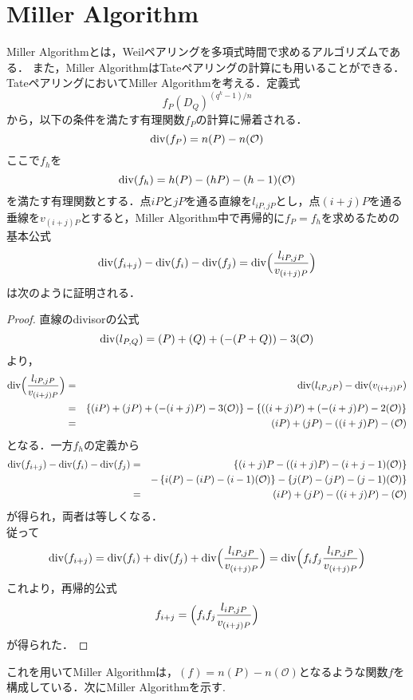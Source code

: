 \section{Miller Algorithm}
\par
Miller Algorithm\cite{MIA}とは，Weilペアリングを多項式時間で求めるアルゴリズムである．
また，Miller AlgorithmはTateペアリングの計算にも用いることができる．TateペアリングにおいてMiller Algorithmを考える．定義式
\[
f_P(D_Q)^{{(q^k-1)}/n}
\]
から，以下の条件を満たす有理関数$f_P$の計算に帰着される．
\[
{\rm div}(f_P)=n(P)-n(\mathcal{O})
\]
ここで$f_h$を
\[
{\rm div}(f_h)=h(P)-(hP)-(h-1)(\mathcal{O})
\]
を満たす有理関数とする．点$iP$と$jP$を通る直線を$l_{iP,jP}$とし，点$(i+j)P$を通る垂線を$v_{(i+j)P}$とすると，Miller Algorithm中で再帰的に$f_P=f_h$を求めるための基本公式
\[
{\rm div}(f_{i+j})-{\rm div}(f_i)-{\rm div}(f_j)={\rm div}\Bigl(\frac{l_{iP,jP}}{v_{(i+j)P}}\Bigr)
\]
は次のように証明される．
\begin{proof}
直線のdivisorの公式
\[
{\rm div}(l_{P,Q})=(P)+(Q)+(-(P+Q))-3(\mathcal{O})
\]
より，
\begin{eqnarray*}
{\rm div}\Bigl(\frac{l_{iP,jP}}{v_{(i+j)P}}\Bigr)&=&{\rm div}(l_{iP,jP})-{\rm div}(v_{(i+j)P})\\
&=&\left\{(iP)+(jP)+(-(i+j)P)-3(\mathcal{O})\right\}-\left\{((i+j)P)+(-(i+j)P)-2(\mathcal{O})\right\}\\
&=&(iP)+(jP)-((i+j)P)-(\mathcal{O})
\end{eqnarray*}となる．一方$f_h$の定義から
\begin{eqnarray*}
{\rm div}(f_{i+j})-{\rm div}(f_i)-{\rm div}(f_j)&=&\left\{(i+j)P-((i+j)P)-(i+j-1)(\mathcal{O})\right\}\\
&\ \ \ &-\left\{i(P)-(iP)-(i-1)(\mathcal{O})\right\}-\left\{j(P)-(jP)-(j-1)(\mathcal{O})\right\}\\
&=&(iP)+(jP)-((i+j)P)-(\mathcal{O})
\end{eqnarray*}が得られ，両者は等しくなる．\\
従って
\[
{\rm div}(f_{i+j})={\rm div}(f_i)+{\rm div}(f_j)+{\rm div}\Bigl(\frac{l_{iP,jP}}{v_{(i+j)P}}\Bigr)={\rm div}\Bigl(f_if_j\frac{l_{iP,jP}}{v_{(i+j)P}}\Bigr)
\]
これより，再帰的公式
\[
f_{i+j}=\Bigl(f_if_j\frac{l_{iP,jP}}{v_{(i+j)P}}\Bigr)
\]が得られた．
\end{proof}
これを用いてMiller Algorithmは，$(f) = n(P) - n(\mathcal{O})$となるような関数$f$を構成している．次にMiller Algorithmを示す. 
\par
